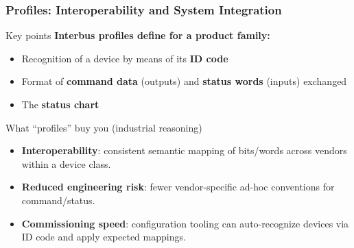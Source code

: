 \begin{frame}
	\frametitle{Profiles: Interoperability and System Integration}
	\begin{block}{Key points}
		\textbf{Interbus profiles define for a product family:}
		\begin{itemize}
			\item Recognition of a device by means of its \textbf{ID code}
			\item Format of \textbf{command data} (outputs) and \textbf{status words} (inputs) exchanged
			\item The \textbf{status chart}
		\end{itemize}
	\end{block}
	\begin{block}{What ``profiles'' buy you (industrial reasoning)}
		\begin{itemize}
			\item \textbf{Interoperability}: consistent semantic mapping of bits/words across vendors within a device class.
			\item \textbf{Reduced engineering risk}: fewer vendor-specific ad-hoc conventions for command/status.
			\item \textbf{Commissioning speed}: configuration tooling can auto-recognize devices via ID code and apply expected mappings.
		\end{itemize}
	\end{block}
\end{frame}
